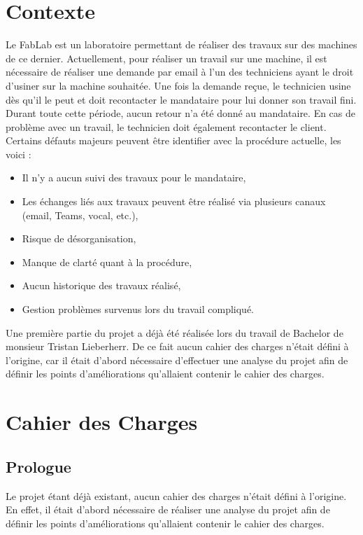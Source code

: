 \documentclass[
    iai, %
    il, %
]{heig-tb}
\begin{document}
\section{Contexte}
Le FabLab est un laboratoire permettant de réaliser des travaux sur des machines de ce dernier. Actuellement, pour réaliser un travail sur une machine, il est nécessaire de réaliser une demande par email à l’un des techniciens ayant le droit d’usiner sur la machine souhaitée. Une fois la demande reçue, le technicien usine dès qu’il le peut et doit recontacter le mandataire pour lui donner son travail fini. Durant toute cette période, aucun retour n’a été donné au mandataire. En cas de problème avec un travail, le technicien doit également recontacter le client.
Certains défauts majeurs peuvent être identifier avec la procédure actuelle, les voici :
\begin{itemize}
    \item Il n’y a aucun suivi des travaux pour le mandataire, \cite{lieberherr}
    \item Les échanges liés aux travaux peuvent être réalisé via plusieurs canaux (email, Teams, vocal, etc.), \cite{lieberherr}
    \item Risque de désorganisation, \cite{lieberherr}
    \item Manque de clarté quant à la procédure, \cite{lieberherr}
    \item Aucun historique des travaux réalisé,
    \item Gestion problèmes survenus lors du travail compliqué.
\end{itemize}
Une première partie du projet a déjà été réalisée lors du travail de Bachelor de monsieur Tristan Lieberherr. De ce fait aucun cahier des charges n’était défini à l’origine, car il était d’abord nécessaire d’effectuer une analyse du projet afin de définir les points d’améliorations qu’allaient contenir le cahier des charges.


\section{Cahier des Charges}

\subsection{Prologue}

Le projet étant déjà existant, aucun cahier des charges n'était défini à
l'origine. En effet, il était d'abord nécessaire de réaliser une analyse
du projet afin de définir les points d'améliorations qu'allaient
contenir le cahier des charges.
\end{document}
